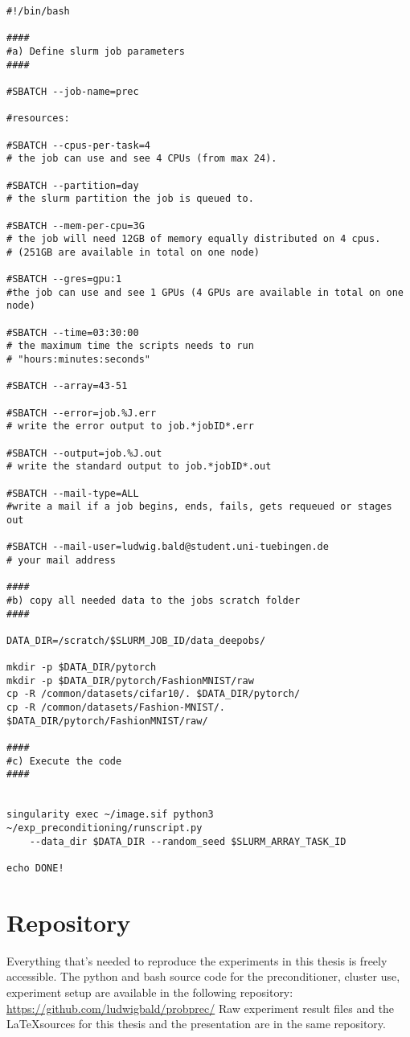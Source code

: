 \documentclass[twoside,12pt,a4paper]{report}
\begin{document}
\begin{verbatim}
#!/bin/bash

####
#a) Define slurm job parameters
####

#SBATCH --job-name=prec

#resources:

#SBATCH --cpus-per-task=4
# the job can use and see 4 CPUs (from max 24).

#SBATCH --partition=day
# the slurm partition the job is queued to.

#SBATCH --mem-per-cpu=3G
# the job will need 12GB of memory equally distributed on 4 cpus.
# (251GB are available in total on one node)

#SBATCH --gres=gpu:1
#the job can use and see 1 GPUs (4 GPUs are available in total on one node)

#SBATCH --time=03:30:00
# the maximum time the scripts needs to run
# "hours:minutes:seconds"

#SBATCH --array=43-51

#SBATCH --error=job.%J.err
# write the error output to job.*jobID*.err

#SBATCH --output=job.%J.out
# write the standard output to job.*jobID*.out

#SBATCH --mail-type=ALL
#write a mail if a job begins, ends, fails, gets requeued or stages out

#SBATCH --mail-user=ludwig.bald@student.uni-tuebingen.de
# your mail address

####
#b) copy all needed data to the jobs scratch folder
####

DATA_DIR=/scratch/$SLURM_JOB_ID/data_deepobs/

mkdir -p $DATA_DIR/pytorch
mkdir -p $DATA_DIR/pytorch/FashionMNIST/raw
cp -R /common/datasets/cifar10/. $DATA_DIR/pytorch/
cp -R /common/datasets/Fashion-MNIST/. $DATA_DIR/pytorch/FashionMNIST/raw/

####
#c) Execute the code
####


singularity exec ~/image.sif python3 ~/exp_preconditioning/runscript.py 
    --data_dir $DATA_DIR --random_seed $SLURM_ARRAY_TASK_ID

echo DONE!
\end{verbatim}

\section{Repository}
Everything that's needed to reproduce the experiments in this thesis is freely accessible.
The python and bash source code for the preconditioner, cluster use, experiment setup are available in the following repository:
\url{https://github.com/ludwigbald/probprec/}
Raw experiment result files and the \LaTeX sources for this thesis and the presentation are in the same repository.
\end{document}
